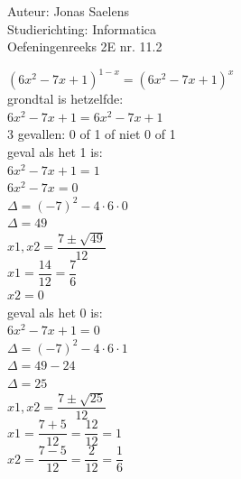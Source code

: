 \documentclass[a4paper]{article}
\begin{document}
\noindent \large Auteur: Jonas Saelens \\
\noindent \large Studierichting: Informatica\\
\noindent \large Oefeningenreeks 2E nr. 11.2\\

\medskip

\normalsize

$\left(6x^2-7x+1\right)^{1-x} = \left(6x^2-7x+1\right)^x$\\

grondtal is hetzelfde:\\

$6x^2-7x+1 = 6x^2-7x+1$\\

3 gevallen: 0 of 1 of niet 0 of 1\\

geval als het 1 is:\\

$6x^2-7x+1 = 1$\\

$6x^2-7x = 0$\\

$\Delta = \left(-7\right)^2 - 4 \cdot 6 \cdot 0$\\

$\Delta = 49$\\

$x1,x2 = \dfrac{7 \pm \sqrt{49}}{12}$\\

$x1 = \dfrac{14}{12} = \dfrac{7}{6}$\\

$x2 = 0$\\

geval als het 0 is:\\

$6x^2-7x+1 = 0$\\

$\Delta = \left(-7\right)^2 - 4 \cdot 6 \cdot 1$\\

$\Delta = 49-24$\\

$\Delta = 25$\\

$x1,x2 = \dfrac{7 \pm \sqrt{25}}{12}$\\

$x1 = \dfrac{7+5}{12} = \dfrac{12}{12} = 1$\\

$x2 = \dfrac{7-5}{12} = \dfrac{2}{12} = \dfrac{1}{6}$\\
\end{document}
